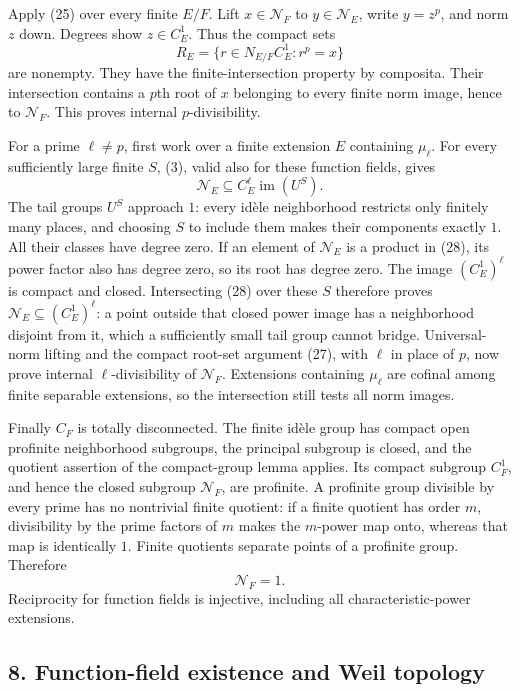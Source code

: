 \documentclass[11pt,a4paper]{article}
\begin{document}
Apply (25) over every finite \(E/F\). Lift \(x\in\mathcal N_F\) to
\(y\in\mathcal N_E\), write \(y=z^p\), and norm \(z\) down. Degrees show
\(z\in C_E^1\). Thus the compact sets \[
R_E=\{r\in N_{E/F}C_E^1:r^p=x\}
\tag{27}
\] are nonempty. They have the finite-intersection property by
composita. Their intersection contains a \(p\)th root of \(x\) belonging
to every finite norm image, hence to \(\mathcal N_F\). This proves
internal \(p\)-divisibility.

For a prime \(\ell\ne p\), first work over a finite extension \(E\)
containing \(\mu_\ell\). For every sufficiently large finite \(S\), (3),
valid also for these function fields, gives \[
\mathcal N_E\subseteq C_E^\ell\operatorname{im}(U^S).
\tag{28}
\] The tail groups \(U^S\) approach \(1\): every idèle neighborhood
restricts only finitely many places, and choosing \(S\) to include them
makes their components exactly \(1\). All their classes have degree
zero. If an element of \(\mathcal N_E\) is a product in (28), its power
factor also has degree zero, so its root has degree zero. The image
\((C_E^1)^\ell\) is compact and closed. Intersecting (28) over these
\(S\) therefore proves \(\mathcal N_E\subseteq(C_E^1)^\ell\): a point
outside that closed power image has a neighborhood disjoint from it,
which a sufficiently small tail group cannot bridge. Universal-norm
lifting and the compact root-set argument (27), with \(\ell\) in place
of \(p\), now prove internal \(\ell\)-divisibility of \(\mathcal N_F\).
Extensions containing \(\mu_\ell\) are cofinal among finite separable
extensions, so the intersection still tests all norm images.

Finally \(C_F\) is totally disconnected. The finite idèle group has
compact open profinite neighborhood subgroups, the principal subgroup is
closed, and the quotient assertion of the compact-group lemma applies.
Its compact subgroup \(C_F^1\), and hence the closed subgroup
\(\mathcal N_F\), are profinite. A profinite group divisible by every
prime has no nontrivial finite quotient: if a finite quotient has order
\(m\), divisibility by the prime factors of \(m\) makes the \(m\)-power
map onto, whereas that map is identically \(1\). Finite quotients
separate points of a profinite group. Therefore \[
\mathcal N_F=1.
\tag{29}
\] Reciprocity for function fields is injective, including all
characteristic-power extensions.

\subsection{8. Function-field existence and Weil
topology}\label{function-field-existence-and-weil-topology}
\end{document}
